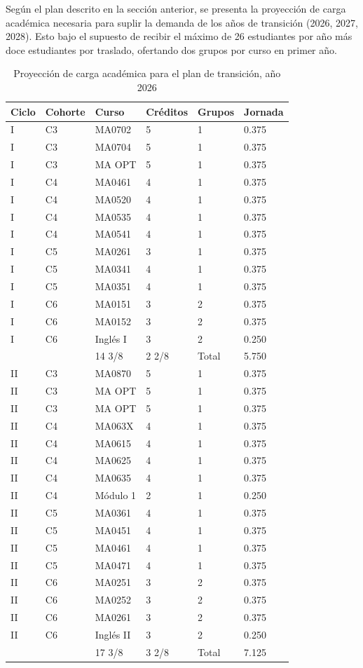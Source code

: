 Según el plan descrito en la sección anterior, se presenta la proyección de carga académica necesaria para suplir la demanda de los años de transición (2026, 2027, 2028). Esto bajo el supuesto de recibir el máximo de 26 estudiantes por año más doce estudiantes por traslado, ofertando dos grupos por curso en primer año.

\begin{longtable}[c]{|l|l|l|l|l|l|}
\caption{Proyección de carga académica para el plan de transición, año 2026}
\label{tab:carga2026}\\
\hline
\rowcolor[HTML]{00C0F3}
Ciclo & Cohorte & Curso & Créditos & Grupos & Jornada \\ \hline
\endhead
%
I & C3 & MA0702 & 5 & 1 & 0.375 \\ \hline
I & C3 & MA0704 & 5 & 1 & 0.375 \\ \hline
I & C3 & MA OPT & 5 & 1 & 0.375 \\ \hline
I & C4 & MA0461 & 4 & 1 & 0.375 \\ \hline
I & C4 & MA0520 & 4 & 1 & 0.375 \\ \hline
I & C4 & MA0535 & 4 & 1 & 0.375 \\ \hline
I & C4 & MA0541 & 4 & 1 & 0.375 \\ \hline
I & C5 & MA0261 & 3 & 1 & 0.375 \\ \hline
I & C5 & MA0341 & 4 & 1 & 0.375 \\ \hline
I & C5 & MA0351 & 4 & 1 & 0.375 \\ \hline
I & C6 & MA0151 & 3 & 2 & 0.375 \\ \hline
I & C6 & MA0152 & 3 & 2 & 0.375 \\ \hline
I & C6 & Inglés I & 3 & 2 & 0.250 \\ \hline
 &  & 14 3/8 & 2 2/8 & Total & 5.750 \\ \hline
II & C3 & MA0870 & 5 & 1 & 0.375 \\ \hline
II & C3 & MA OPT & 5 & 1 & 0.375 \\ \hline
II & C3 & MA OPT & 5 & 1 & 0.375 \\ \hline
II & C4 & MA063X & 4 & 1 & 0.375 \\ \hline
II & C4 & MA0615 & 4 & 1 & 0.375 \\ \hline
II & C4 & MA0625 & 4 & 1 & 0.375 \\ \hline
II & C4 & MA0635 & 4 & 1 & 0.375 \\ \hline
II & C4 & Módulo 1 & 2 & 1 & 0.250 \\ \hline
II & C5 & MA0361 & 4 & 1 & 0.375 \\ \hline
II & C5 & MA0451 & 4 & 1 & 0.375 \\ \hline
II & C5 & MA0461 & 4 & 1 & 0.375 \\ \hline
II & C5 & MA0471 & 4 & 1 & 0.375 \\ \hline
II & C6 & MA0251 & 3 & 2 & 0.375 \\ \hline
II & C6 & MA0252 & 3 & 2 & 0.375 \\ \hline
II & C6 & MA0261 & 3 & 2 & 0.375 \\ \hline
II & C6 & Inglés II & 3 & 2 & 0.250 \\ \hline
 &  & 17 3/8 & 3 2/8 & Total & 7.125 \\ \hline
\end{longtable}

